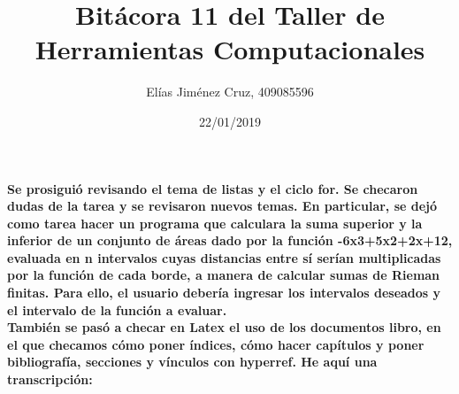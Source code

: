 \documentclass[letterpaper, 12pt, oneside]{article} %
\title{\Huge Bitácora 11 del Taller de Herramientas Computacionales}
\author{Elías Jiménez Cruz, 409085596}
\date{22/01/2019}
\begin{document}
	\maketitle
	\paragraph{Se prosiguió revisando el tema de listas y el ciclo for. Se checaron dudas de la tarea y se revisaron nuevos temas. En particular, se dejó como tarea hacer un programa que calculara la suma superior y la inferior de un conjunto de áreas dado por la función -6x3+5x2+2x+12, evaluada en n intervalos cuyas distancias entre sí serían multiplicadas por la función de cada borde, a manera de calcular sumas de Rieman finitas. Para ello, el usuario debería ingresar los intervalos deseados y el intervalo de la función a evaluar.\\También se pasó a checar en Latex el uso de los documentos libro, en el que checamos cómo poner índices, cómo hacer capítulos y poner bibliografía, secciones y vínculos con hyperref. He aquí una transcripción:}
\end{document}

